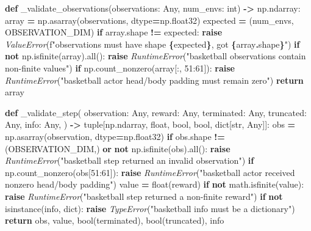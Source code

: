 \documentclass[
  chinese,
  11pt,
  letterpaper,
]{article}
\newenvironment{Shaded}{\begin{snugshade}}{\end{snugshade}}
\newcommand{\BuiltInTok}[1]{#1}
\newcommand{\ControlFlowTok}[1]{\textcolor[rgb]{0.13,0.29,0.53}{\textbf{#1}}}
\newcommand{\DecValTok}[1]{\textcolor[rgb]{0.00,0.00,0.81}{#1}}
\newcommand{\KeywordTok}[1]{\textcolor[rgb]{0.13,0.29,0.53}{\textbf{#1}}}
\newcommand{\NormalTok}[1]{#1}
\newcommand{\OperatorTok}[1]{\textcolor[rgb]{0.81,0.36,0.00}{\textbf{#1}}}
\newcommand{\PreprocessorTok}[1]{\textcolor[rgb]{0.56,0.35,0.01}{\textit{#1}}}
\newcommand{\SpecialCharTok}[1]{\textcolor[rgb]{0.81,0.36,0.00}{\textbf{#1}}}
\newcommand{\SpecialStringTok}[1]{\textcolor[rgb]{0.31,0.60,0.02}{#1}}
\newcommand{\StringTok}[1]{\textcolor[rgb]{0.31,0.60,0.02}{#1}}
\renewenvironment{Shaded}{\par\smallskip}{\par\smallskip}
\begin{document}
\begin{Shaded}
\begin{Highlighting}[]
\KeywordTok{def}\NormalTok{ \_validate\_observations(observations: Any, num\_envs: }\BuiltInTok{int}\NormalTok{) }\OperatorTok{{-}\textgreater{}}\NormalTok{ np.ndarray:}
\NormalTok{    array }\OperatorTok{=}\NormalTok{ np.asarray(observations, dtype}\OperatorTok{=}\NormalTok{np.float32)}
\NormalTok{    expected }\OperatorTok{=}\NormalTok{ (num\_envs, OBSERVATION\_DIM)}
    \ControlFlowTok{if}\NormalTok{ array.shape }\OperatorTok{!=}\NormalTok{ expected:}
        \ControlFlowTok{raise} \PreprocessorTok{ValueError}\NormalTok{(}\SpecialStringTok{f"observations must have shape }\SpecialCharTok{\{}\NormalTok{expected}\SpecialCharTok{\}}\SpecialStringTok{, got }\SpecialCharTok{\{}\NormalTok{array}\SpecialCharTok{.}\NormalTok{shape}\SpecialCharTok{\}}\SpecialStringTok{"}\NormalTok{)}
    \ControlFlowTok{if} \KeywordTok{not}\NormalTok{ np.isfinite(array).}\BuiltInTok{all}\NormalTok{():}
        \ControlFlowTok{raise} \PreprocessorTok{RuntimeError}\NormalTok{(}\StringTok{"basketball observations contain non{-}finite values"}\NormalTok{)}
    \ControlFlowTok{if}\NormalTok{ np.count\_nonzero(array[:, }\DecValTok{51}\NormalTok{:}\DecValTok{61}\NormalTok{]):}
        \ControlFlowTok{raise} \PreprocessorTok{RuntimeError}\NormalTok{(}\StringTok{"basketball actor head/body padding must remain zero"}\NormalTok{)}
    \ControlFlowTok{return}\NormalTok{ array}


\KeywordTok{def}\NormalTok{ \_validate\_step(}
\NormalTok{    observation: Any,}
\NormalTok{    reward: Any,}
\NormalTok{    terminated: Any,}
\NormalTok{    truncated: Any,}
\NormalTok{    info: Any,}
\NormalTok{) }\OperatorTok{{-}\textgreater{}} \BuiltInTok{tuple}\NormalTok{[np.ndarray, }\BuiltInTok{float}\NormalTok{, }\BuiltInTok{bool}\NormalTok{, }\BuiltInTok{bool}\NormalTok{, }\BuiltInTok{dict}\NormalTok{[}\BuiltInTok{str}\NormalTok{, Any]]:}
\NormalTok{    obs }\OperatorTok{=}\NormalTok{ np.asarray(observation, dtype}\OperatorTok{=}\NormalTok{np.float32)}
    \ControlFlowTok{if}\NormalTok{ obs.shape }\OperatorTok{!=}\NormalTok{ (OBSERVATION\_DIM,) }\KeywordTok{or} \KeywordTok{not}\NormalTok{ np.isfinite(obs).}\BuiltInTok{all}\NormalTok{():}
        \ControlFlowTok{raise} \PreprocessorTok{RuntimeError}\NormalTok{(}\StringTok{"basketball step returned an invalid observation"}\NormalTok{)}
    \ControlFlowTok{if}\NormalTok{ np.count\_nonzero(obs[}\DecValTok{51}\NormalTok{:}\DecValTok{61}\NormalTok{]):}
        \ControlFlowTok{raise} \PreprocessorTok{RuntimeError}\NormalTok{(}\StringTok{"basketball actor received nonzero head/body padding"}\NormalTok{)}
\NormalTok{    value }\OperatorTok{=} \BuiltInTok{float}\NormalTok{(reward)}
    \ControlFlowTok{if} \KeywordTok{not}\NormalTok{ math.isfinite(value):}
        \ControlFlowTok{raise} \PreprocessorTok{RuntimeError}\NormalTok{(}\StringTok{"basketball step returned a non{-}finite reward"}\NormalTok{)}
    \ControlFlowTok{if} \KeywordTok{not} \BuiltInTok{isinstance}\NormalTok{(info, }\BuiltInTok{dict}\NormalTok{):}
        \ControlFlowTok{raise} \PreprocessorTok{TypeError}\NormalTok{(}\StringTok{"basketball info must be a dictionary"}\NormalTok{)}
    \ControlFlowTok{return}\NormalTok{ obs, value, }\BuiltInTok{bool}\NormalTok{(terminated), }\BuiltInTok{bool}\NormalTok{(truncated), info}



\end{Highlighting}
\end{Shaded}
\end{document}
